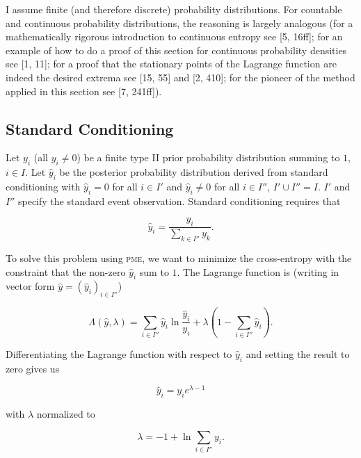 \documentclass[entropy,article,submit,oneauthor,pdftex,12pt,a4paper]{mdpi}
\begin{document}
I assume finite (and therefore discrete) probability distributions.
For countable and continuous probability distributions, the reasoning
is largely analogous (for a mathematically rigorous introduction to
continuous entropy see [5, 16ff]; for an example of how to do a proof
of this section for continuous probability densities see [1, 11]; for
a proof that the stationary points of the Lagrange function are indeed
the desired extrema see [15, 55] and [2, 410]; for the pioneer of the
method applied in this section see [7, 241ff]).

\subsection{Standard Conditioning}
\label{sc}

Let $y_{i}$ (all $y_{i}\neq{}0$) be a finite type II prior probability
distribution summing to $1$, $i\in{}I$. Let $\hat{y}_{i}$ be the
posterior probability distribution derived from standard conditioning
with $\hat{y}_{i}=0$ for all $i\in{}I'$ and $\hat{y}_{i}\neq{}0$ for
all $i\in{}I''$, $I'\cup{}I''=I$. $I'$ and $I''$ specify the standard
event observation. Standard conditioning requires that

\begin{equation}
  \label{eq:sc}
  \hat{y}_{i}=\frac{y_{i}}{\sum_{k\in{}I''}y_{k}}.
\end{equation}

{\noindent}To solve this problem using \textsc{pme}, we want to minimize the
cross-entropy with the constraint that the non-zero $\hat{y}_{i}$ sum to
$1$. The Lagrange function is (writing in vector form
$\hat{y}=(\hat{y}_{i})_{i\in{}I''}$)

\begin{equation}
  \label{eq:sclag}
  \Lambda(\hat{y},\lambda)=\sum_{i\in{}I''}\hat{y}_{i}\ln\frac{\hat{y}_{i}}{y_{i}}+\lambda\left(1-\sum_{i\in{}I''}\hat{y}_{i}\right).
\end{equation}

{\noindent}Differentiating the Lagrange function with respect to $\hat{y}_{i}$ and
setting the result to zero gives us

\begin{equation}
  \label{eq:sc1}
  \hat{y}_{i}=y_{i}e^{\lambda-1}
\end{equation}

{\noindent}with $\lambda$ normalized to

\begin{equation}
  \label{eq:sc2}
  \lambda=-1+\ln{}\sum_{i\in{}I''}y_{i}.
\end{equation}
\end{document}
